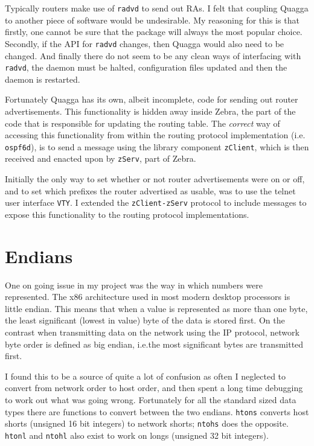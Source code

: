 \documentclass[12pt]{report}
\begin{document}
Typically routers make use of \texttt{radvd}  to send out RAs. I felt that coupling Quagga to another
piece of software would be undesirable. My reasoning for this is that firstly,
one cannot be sure that the package will always the most popular choice.
Secondly, if the API for \texttt{radvd} changes, then Quagga would also need to be
changed. And finally there do not seem to be any clean ways of interfacing with
\texttt{radvd}, the daemon must be halted, configuration files updated and then the
daemon is restarted.

Fortunately Quagga has its own, albeit incomplete, code for sending out router
advertisements.  This functionality is hidden away inside Zebra, the part of
the code that is responsible for updating the routing table. The \emph{correct}
way of accessing this functionality from within the routing protocol
implementation (i.e.  \texttt{ospf6d}), is to send a message using the library
component \texttt{zClient}, which is then received and enacted upon by
\texttt{zServ}, part of Zebra. 

Initially the only way to set whether or not router advertisements were on or
off, and to set which prefixes the router advertised as usable, was to use the
telnet user interface \texttt{VTY}. I extended the \texttt{zClient-zServ}
protocol to include messages to expose this functionality to the routing
protocol implementations. 

\section{Endians}
One on going issue in my project was the way in which numbers were represented.
The x86 architecture used in most modern desktop processors is little endian.
This means that when a value is represented as more than one byte, the least
significant (lowest in value) byte of the data is stored first. On the contrast
when transmitting data on the network using the IP protocol, network byte order
is defined as big endian, i.e.\@ the most significant bytes are transmitted
first. 

I found this to be a source of quite a lot of confusion as often I neglected to
convert from network order to host order, and then spent a long time debugging
to work out what was going wrong. Fortunately for all the standard sized data
types there are functions to convert between the two endians. \texttt{htons}
converts host shorts (unsigned 16 bit integers) to network shorts;
\texttt{ntohs} does the opposite. \texttt{htonl} and \texttt{ntohl} also exist
to work on longs (unsigned 32 bit integers). 
\end{document}
